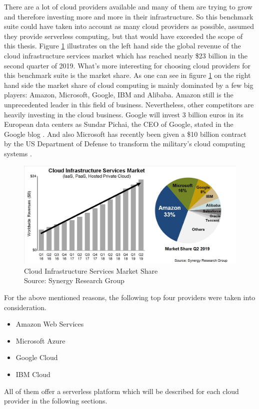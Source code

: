 There are a lot of cloud providers available and many of them are trying to grow and therefore investing more and more in their infrastructure. So this benchmark suite could have taken into account as many cloud providers as possible, assumed they provide serverless computing, but that would have exceeded the scope of this thesis. Figure \ref{fig:market_share} illustrates on the left hand side the global revenue of the cloud infrastructure services market which has reached nearly \$23 billion in the second quarter of 2019. What's more interesting for choosing cloud providers for this benchmark suite is the market share. As one can see in figure \ref{fig:market_share} on the right hand side the market share of cloud computing is mainly dominated by a few big players: Amazon, Microsoft, Google, \gls{IBM} and Alibaba. Amazon still is the unprecedented leader in this field of business. Nevertheless, other competitors are heavily investing in the cloud business. Google will invest 3 billion euros in its European data centers as Sundar Pichai, the \gls{CEO} of Google, stated in the Google blog \cite{GoogleBlog}. And also Microsoft has recently been given a \$10 billion contract by the US Department of Defense to transform the military's cloud computing systems \cite{NYJEDI, JEDI}.

\begin{figure}[htp]
\begin{center}
\includegraphics[scale=0.6]{bilder/synergy.jpg}
\captionsetup[table]{justification=centering, labelfont=bf}
\caption[Cloud Infrastructure Services Market Share]{Cloud Infrastructure Services Market Share\\Source: Synergy Research Group \cite{Synergy}}
\label{fig:market_share}
\end{center}
\end{figure}

For the above mentioned reasons, the following top four providers were taken into consideration.
\begin{itemize}
  \item Amazon Web Services
  \item Microsoft Azure
  \item Google Cloud
  \item IBM Cloud
\end{itemize}
All of them offer a serverless platform which will be described for each cloud provider in the following sections.

